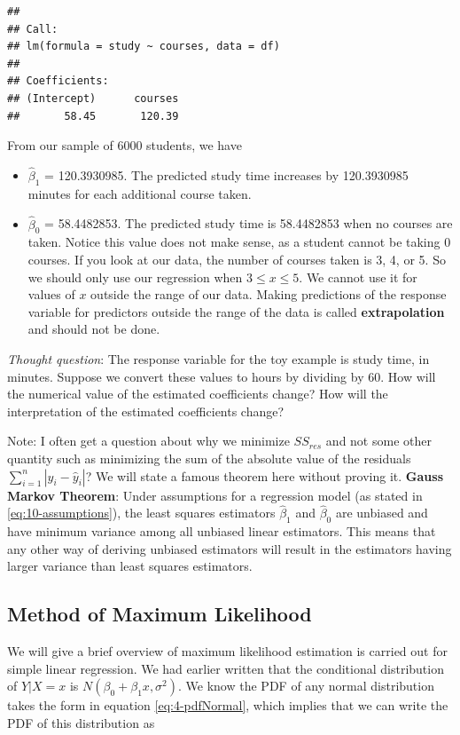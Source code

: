 \documentclass[
]{book}
\providecommand{\tightlist}{%
  \setlength{\itemsep}{0pt}\setlength{\parskip}{0pt}}
\begin{document}
\begin{verbatim}
## 
## Call:
## lm(formula = study ~ courses, data = df)
## 
## Coefficients:
## (Intercept)      courses  
##       58.45       120.39
\end{verbatim}

From our sample of 6000 students, we have

\begin{itemize}
\tightlist
\item
  \(\hat{\beta}_1\) = 120.3930985. The predicted study time increases by 120.3930985 minutes for each additional course taken.
\item
  \(\hat{\beta}_0\) = 58.4482853. The predicted study time is 58.4482853 when no courses are taken. Notice this value does not make sense, as a student cannot be taking 0 courses. If you look at our data, the number of courses taken is 3, 4, or 5. So we should only use our regression when \(3 \leq x \leq 5\). We cannot use it for values of \(x\) outside the range of our data. Making predictions of the response variable for predictors outside the range of the data is called \textbf{extrapolation} and should not be done.
\end{itemize}

\emph{Thought question}: The response variable for the toy example is study time, in minutes. Suppose we convert these values to hours by dividing by 60. How will the numerical value of the estimated coefficients change? How will the interpretation of the estimated coefficients change?

Note: I often get a question about why we minimize \(SS_{res}\) and not some other quantity such as minimizing the sum of the absolute value of the residuals \(\sum_{i=1}^n |y_i - \hat{y}_i|\)? We will state a famous theorem here without proving it. \textbf{Gauss Markov Theorem}: Under assumptions for a regression model (as stated in \eqref{eq:10-assumptions}), the least squares estimators \(\hat{\beta}_1\) and \(\hat{\beta}_0\) are unbiased and have minimum variance among all unbiased linear estimators. This means that any other way of deriving unbiased estimators will result in the estimators having larger variance than least squares estimators.

\subsection{Method of Maximum Likelihood}\label{method-of-maximum-likelihood}

We will give a brief overview of maximum likelihood estimation is carried out for simple linear regression. We had earlier written that the conditional distribution of \(Y|X=x\) is \(N(\beta_0+\beta_{1} x, \sigma^2)\). We know the PDF of any normal distribution takes the form in equation \eqref{eq:4-pdfNormal}, which implies that we can write the PDF of this distribution as
\end{document}
